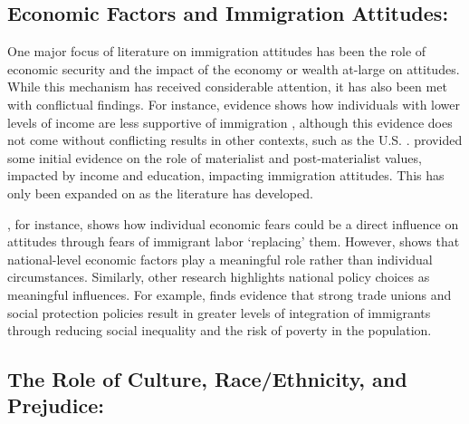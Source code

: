 \documentclass[12pt,]{article}
\begin{document}
\subsection{Economic Factors and Immigration
Attitudes:}\label{economic-factors-and-immigration-attitudes}

One major focus of literature on immigration attitudes has been the role
of economic security and the impact of the economy or wealth at-large on
attitudes. While this mechanism has received considerable attention, it
has also been met with conflictual findings. For instance, evidence
shows how individuals with lower levels of income are less supportive of
immigration \citep{arvanitidis2021, young2018, hoskin1983}, although
this evidence does not come without conflicting results in other
contexts, such as the U.S. \citep{binder1997}. \citet{hoskin1983}
provided some initial evidence on the role of materialist and
post-materialist values, impacted by income and education, impacting
immigration attitudes. This has only been expanded on as the literature
has developed.

\citet{burns2000}, for instance, shows how individual economic fears
could be a direct influence on attitudes through fears of immigrant
labor `replacing' them. However, \citet{hainmueller2014} shows that
national-level economic factors play a meaningful role rather than
individual circumstances. Similarly, other research highlights national
policy choices as meaningful influences. For example,
\citet{artiles2014} finds evidence that strong trade unions and social
protection policies result in greater levels of integration of
immigrants through reducing social inequality and the risk of poverty in
the population.

\subsection{The Role of Culture, Race/Ethnicity, and
Prejudice:}\label{the-role-of-culture-raceethnicity-and-prejudice}
\end{document}

